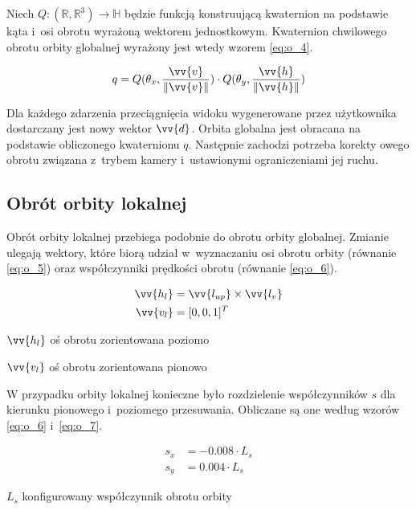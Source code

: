 Niech $Q: (\mathbb{R}, \mathbb{R}^3) \to \mathbb{H}$ będzie funkcją konstruującą kwaternion na podstawie kąta i~osi obrotu wyrażoną wektorem jednostkowym. Kwaternion chwilowego obrotu orbity globalnej wyrażony jest wtedy wzorem \ref{eq:o_4}.

\begin{samepage}
    \begin{equation}
        \label{eq:o_4}
        q = Q(\theta_x, \frac{\vv{v}}{\Vert\vv{v}\Vert}) \cdot Q(\theta_y, \frac{\vv{h}}{\Vert\vv{h}\Vert})
    \end{equation}
    \vspace{\baselineskip}
\end{samepage}

Dla każdego zdarzenia przeciągnięcia widoku wygenerowane przez użytkownika dostarczany jest nowy wektor $\vv{d}$. Orbita globalna jest obracana na podstawie obliczonego kwaternionu $q$. Następnie zachodzi potrzeba korekty owego obrotu związana z~trybem kamery i~ustawionymi ograniczeniami jej ruchu. 

\subsection{Obrót orbity lokalnej}
Obrót orbity lokalnej przebiega podobnie do obrotu orbity globalnej. Zmianie ulegają wektory, które biorą udział w~wyznaczaniu osi obrotu orbity (równanie \ref{eq:o_5}) oraz współczynniki prędkości obrotu (równanie \ref{eq:o_6}).

\begin{samepage}
    \begin{align}
        \label{eq:o_5}
        \vv{h_l} &= \vv{l_{up}} \times \vv{l_{v}}\\
        \vv{v_l} &= [0, 0, 1]^T
    \end{align}
    \begin{eqexpl}[25mm]
        \item {$\vv{h_l}$} oś obrotu zorientowana poziomo
        \item {$\vv{v_l}$} oś obrotu zorientowana pionowo
    \end{eqexpl}
    \vspace{\baselineskip}
\end{samepage}

W przypadku orbity lokalnej konieczne było rozdzielenie współczynników $s$ dla kierunku pionowego i~poziomego przesuwania. Obliczane są one według wzorów \ref{eq:o_6} i~\ref{eq:o_7}.

\begin{samepage}
    \begin{align}
        \label{eq:o_6}
        s_x &= -0.008 \cdot L_s \\
        \label{eq:o_7}
        s_y &= 0.004 \cdot L_s
    \end{align}
    \begin{eqexpl}[25mm]
        \item {$L_s$} konfigurowany współczynnik obrotu orbity 
    \end{eqexpl}
    \vspace{\baselineskip}
\end{samepage}

